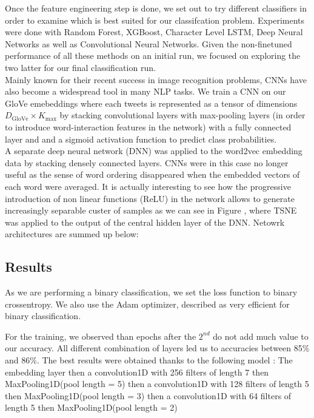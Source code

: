 \documentclass[10pt,conference,compsocconf,retainorgcmds]{IEEEtran}
\begin{document}
Once the feature engineering step is done, we set out to try different classifiers in order to examine which is best suited for our classifcation problem. Experiments were done with Random Forest, XGBoost, Character Level  LSTM, Deep Neural Networks as well as Convolutional Neural Networks. Given the non-finetuned performance of all these methods on an initial run, we focused on exploring the two latter for our final classification run. \\
Mainly known for their recent success in image recognition problems, CNNs have also become a widespread tool in many NLP tasks. We train a CNN on our GloVe emebeddings where each tweets is represented as a tensor of dimensions  $D_{\text{GloVe}}\times K_{\text{max}}$ by stacking convolutional layers with max-pooling layers (in order to introduce word-interaction features in the network) with a fully connected layer and and a sigmoid activation function to predict class probabilities. \\
A separate deep neural network (DNN) was applied to the word2vec embedding data by stacking densely connected layers. CNNs were in this case no longer useful as the sense of word ordering disappeared when the embedded vectors of each word were averaged. It is actually interesting to see how the progressive introduction of non linear functions (ReLU) in the network allows to generate increasingly separable custer of samples as we can see in Figure \cite{hidden}, where TSNE was applied to the output of the central hidden layer of the DNN. Netowrk architectures are summed up below:




\subsection{Results}


As we are performing a binary classification, we set the loss function to binary crossentropy. We also use the Adam optimizer, described as very efficient for binary classification.

For the training, we observed than epochs after the $2^{nd}$ do not add much value to our accuracy. All different combination of layers led us to accuracies between 85\% and 86\%.
The best results were obtained thanks to the following model : The embedding layer then a convolution1D with 256 filters of length 7 then MaxPooling1D(pool length = 5) then a convolution1D with 128 filters of length 5 then MaxPooling1D(pool length = 3) then a convolution1D with 64 filters of length 5 then MaxPooling1D(pool length = 2) 
\end{document}
